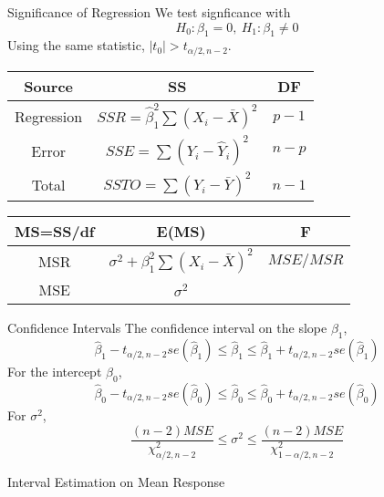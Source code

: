 \documentclass{article}
\begin{document}
\begin{multicols*}{3}
    \begin{blackbox}{Significance of Regression}
        We test signficance with 
        \[H_0: \beta_1 = 0, \ H_1: \beta_1 \neq 0\]
        Using the same statistic, $|t_0| > t_{\alpha/2, n-2}$. 
        \renewcommand{\arraystretch}{1.5}
        \begin{center}
            \begin{tabular}{|c|c|c|}
                \hline
                Source & SS & DF \\
                \hline
                \hline
                Regression & $SSR = \hat{\beta}_1^2\sum(X_i-\bar{X})^2$ & $p-1$ \\
                \hline
                Error & $SSE=\sum(Y_i - \hat{Y}_i)^2$ & $n-p$\\
                \hline 
                Total & $SSTO =\sum(Y_i - \bar{Y})^2$ & $n-1$\\
                \hline
            \end{tabular}
        \end{center}
        \begin{center}
            \begin{tabular}{|c|c|c|}
                \hline
                MS=SS/df & E(MS) & F\\
                \hline
                \hline
                MSR & $\sigma^2 + \beta_1^2\sum(X_i - \bar{X})^2$ & $MSE/MSR$\\
                \hline
                MSE &  $\sigma^2$ &\\
                \hline 
            \end{tabular}
        \end{center}
    \end{blackbox}
    \begin{blackbox}{Confidence Intervals}
        The confidence interval on the slope $\beta_1$,\\[-1ex]
        \[\hat{\beta}_1 - t_{\alpha/2, n-2}se(\hat{\beta}_1) \leq \hat{\beta}_1 \leq \hat{\beta}_1 + t_{\alpha/2, n-2}se(\hat{\beta}_1)\]
        For the intercept $\beta_0$,\\[-1ex]
        \[\hat{\beta}_0 - t_{\alpha/2, n-2}se(\hat{\beta}_0) \leq \hat{\beta}_0 \leq \hat{\beta}_0 + t_{\alpha/2, n-2}se(\hat{\beta}_0)\]
        For $\sigma^2$, \\[-4ex]
        \[\frac{(n-2)MSE}{\chi^2_{\alpha/2, n-2}} \leq \sigma^2 \leq \frac{(n-2)MSE}{\chi^2_{1-\alpha/2, n-2}}\]
        \begin{brownbox}{Interval Estimation on Mean Response}

\end{brownbox}
\end{blackbox}
\end{multicols*}
\end{document}
